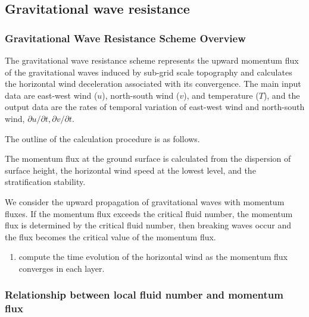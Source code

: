 \hypertarget{gravitational-wave-resistance}{%
\subsection{Gravitational wave
resistance}\label{gravitational-wave-resistance}}

\hypertarget{gravitational-wave-resistance-scheme-overview}{%
\subsubsection{Gravitational Wave Resistance Scheme
Overview}\label{gravitational-wave-resistance-scheme-overview}}

The gravitational wave resistance scheme represents the upward momentum
flux of the gravitational waves induced by sub-grid scale topography and
calculates the horizontal wind deceleration associated with its
convergence. The main input data are east-west wind (\(u\)), north-south
wind (\(v\)), and temperature (\(T\)), and the output data are the rates
of temporal variation of east-west wind and north-south wind,
\(\partial u/\partial t, \partial v/\partial t\).

The outline of the calculation procedure is as follows.

The momentum flux at the ground surface is calculated from the
dispersion of surface height, the horizontal wind speed at the lowest
level, and the stratification stability.

We consider the upward propagation of gravitational waves with momentum
fluxes. If the momentum flux exceeds the critical fluid number, the
momentum flux is determined by the critical fluid number, then breaking
waves occur and the flux becomes the critical value of the momentum
flux.

\begin{enumerate}
\def\labelenumi{\arabic{enumi}.}
\setcounter{enumi}{2}
\tightlist
\item
  compute the time evolution of the horizontal wind as the momentum flux
  converges in each layer.
\end{enumerate}

\hypertarget{relationship-between-local-fluid-number-and-momentum-flux}{%
\subsubsection{Relationship between local fluid number and momentum
flux}\label{relationship-between-local-fluid-number-and-momentum-flux}}

